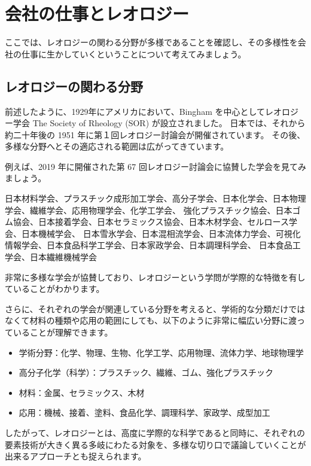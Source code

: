 \documentclass[uplatex,dvipdfmx,a4paper,11pt]{jsarticle}
\begin{document}
\section{会社の仕事とレオロジー}

ここでは、レオロジーの関わる分野が多様であることを確認し、その多様性を会社の仕事に生かしていくということについて考えてみましょう。

\subsection{レオロジーの関わる分野}

前述したように、1929年にアメリカにおいて、Bingham を中心としてレオロジー学会 The Society of Rheology (SOR) が設立されました。
日本では、それから約二十年後の 1951 年に第１回レオロジー討論会が開催されています。
その後、多様な分野へとその適応される範囲は広がってきています。

例えば、2019 年に開催された第 67 回レオロジー討論会に協賛した学会を見てみましょう。
\begin{screen}
	日本材料学会、プラスチック成形加工学会、高分子学会、日本化学会、日本物理学会、繊維学会、応用物理学会、化学工学会、
	強化プラスチック協会、日本ゴム協会、日本接着学会、日本セラミックス協会、日本木材学会、セルロース学会、日本機械学会、
	日本雪氷学会、日本混相流学会、日本流体力学会、可視化情報学会、日本食品科学工学会、日本家政学会、日本調理科学会、
	日本食品工学会、日本繊維機械学会
\end{screen}

非常に多様な学会が協賛しており、レオロジーという学問が学際的な特徴を有していることがわかります。

さらに、それぞれの学会が関連している分野を考えると、学術的な分類だけではなくて材料の種類や応用の範囲にしても、以下のように非常に幅広い分野に渡っていることが理解できます。
	\begin{itemize}
	\item
	  学術分野：化学、物理、生物、化学工学、応用物理、流体力学、地球物理学
	\item
	  高分子化学（科学）：プラスチック、繊維、ゴム、強化プラスチック
	\item
	  材料：金属、セラミックス、木材
	\item
	  応用：機械、接着、塗料、食品化学、調理科学、家政学、成型加工
	\end{itemize}
	
したがって、レオロジーとは、高度に学際的な科学であると同時に、それぞれの要素技術が大きく異る多岐にわたる対象を、多様な切り口で議論していくことが出来るアプローチとも捉えられます。
\end{document}
